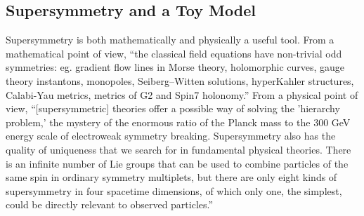 \documentclass{report}
\theoremstyle{plain}
\theoremstyle{definition}
\theoremstyle{remark}
\begin{document}
\subsection{Supersymmetry and a Toy Model}

Supersymmetry is both mathematically and physically a useful tool.
From a mathematical point of view, ``the classical field equations
have non-trivial odd symmetries: eg. gradient flow lines in Morse
theory, holomorphic curves, gauge theory instantons, monopoles,
Seiberg--Witten solutions, hyperKahler structures, Calabi-Yau metrics,
metrics of G2 and Spin7 holonomy.'' From a physical point of view,
``[supersymmetric] theories offer a possible way of solving the
'hierarchy problem,' the mystery of the enormous ratio of the Planck
mass to the 300 GeV energy scale of electroweak symmetry breaking.
Supersymmetry also has the quality of uniqueness that we search for in
fundamental physical theories. There is an infinite number of Lie
groups that can be used to combine particles of the same spin in
ordinary symmetry multiplets, but there are only eight kinds of
supersymmetry in four spacetime dimensions, of which only one, the
simplest, could be directly relevant to observed particles.''
\end{document}
